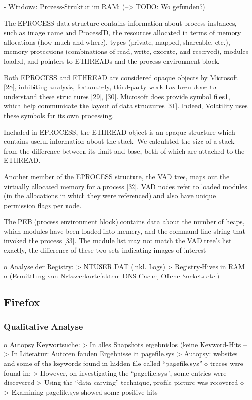 	- Windows: Prozess-Struktur im RAM: 
		(--> TODO: Wo gefunden?)
		
		The EPROCESS data structure contains information about process instances, such as image name and ProcessID, the resources allocated in terms of memory allocations (how much and where), types (private, mapped, shareable, etc.), memory protections (combinations of read, write, execute, and reserved), modules loaded, and pointers to ETHREADs and the process environment block.
		
		Both EPROCESS and ETHREAD are considered opaque objects by Microsoft [28], inhibiting analysis; fortunately, third-party work has been done to understand these struc tures [29], [30]. Microsoft does provide symbol files1, which help communicate the layout of data structures [31]. Indeed, Volatility uses these symbols for its own processing.
		
		Included in EPROCESS, the ETHREAD object is an opaque structure which contains useful information about the stack. We calculated the size of a stack from the difference between its limit and base, both of which are attached to the ETHREAD.
		
		Another member of the EPROCESS structure, the VAD tree, maps out the virtually allocated memory for a process [32]. VAD nodes refer to loaded modules (in the allocations in which they were referenced) and also have unique permission flags per node.
		
		The PEB (process environment block) contains data about the number of heaps, which modules have been loaded into memory, and the command-line string that invoked the process [33]. The module list may not match the VAD tree’s list
		exactly, the difference of these two sets indicating images of interest
		
		
o	Analyse der Registry:
	>	NTUSER.DAT (inkl. Logs)
 	>	Registry-Hives in RAM
o	(Ermittlung von Netzwerkartefakten: DNS-Cache, Offene Sockets etc.)


\subsection{Firefox}


\subsubsection*{Qualitative Analyse}

o	Autopsy Keywortsuche: 
	>	In alles Snapshots ergebnislos (keine Keyword-Hits
	-->	In Literatur: Autoren fanden Ergebnisse in pagefile.sys 
		> Autopsy: websites and some of the keywords found in hidden file called “pagefile.sys” \cite{Mahlous.2020}
		o \cite{Montasari.2015} traces were found in: 
			> However, on investigating the “pagefile.sys”, some entries were discovered
			> Using the “data carving” technique, profile picture was recovered
		o \cite{Said.2011} 
			> Examining pagefile.sys showed some positive hits 
			
